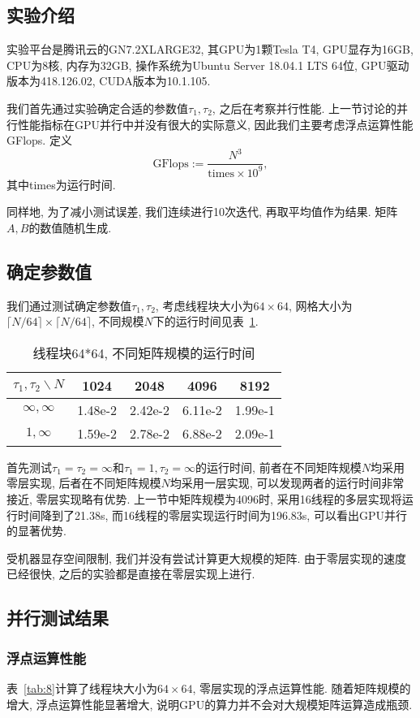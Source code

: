 \documentclass[szjs]{cjcmltx}
\begin{document}
\subsection{实验介绍}
实验平台是腾讯云的GN7.2XLARGE32, 其GPU为1颗Tesla T4, GPU显存为16GB, CPU为8核, 内存为32GB, 操作系统为Ubuntu Server 18.04.1 LTS 64位, GPU驱动版本为418.126.02, CUDA版本为10.1.105.

我们首先通过实验确定合适的参数值$\tau_1,\tau_2$, 之后在考察并行性能. 上一节讨论的并行性能指标在GPU并行中并没有很大的实际意义, 因此我们主要考虑浮点运算性能GFlops. 定义
\[\text{GFlops}:=\dfrac{N^3}{\text{times}\times 10^9},\]
其中times为运行时间.

同样地, 为了减小测试误差, 我们连续进行10次迭代, 再取平均值作为结果. 矩阵$A,B$的数值随机生成.

\subsection{确定参数值}
我们通过测试确定参数值$\tau_1,\tau_2$, 考虑线程块大小为$64\times 64$, 网格大小为$\lceil N/64\rceil\times\lceil N/64\rceil$, 不同规模$N$下的运行时间见表~\ref{tab:7}. 

\begin{table}[htbp]\centering\caption{线程块64*64, 不同矩阵规模的运行时间}\label{tab:7}
\begin{tabular}{|c|c|c|c|c|}\hline
$\tau_1,\tau_2\backslash N$ & 1024 & 2048 & 4096 & 8192\\
\hline
$\infty,\infty$ & 1.48e-2 & 2.42e-2 & 6.11e-2 & 1.99e-1\\
\hline
$1,\infty$ & 1.59e-2 & 2.78e-2 & 6.88e-2 & 2.09e-1\\
\hline
\end{tabular}
\end{table}

首先测试$\tau_1=\tau_2=\infty$和$\tau_1=1,\tau_2=\infty$的运行时间, 前者在不同矩阵规模$N$均采用零层实现, 后者在不同矩阵规模$N$均采用一层实现, 可以发现两者的运行时间非常接近, 零层实现略有优势. 上一节中矩阵规模为4096时, 采用16线程的多层实现将运行时间降到了21.38s, 而16线程的零层实现运行时间为196.83s, 可以看出GPU并行的显著优势.

受机器显存空间限制, 我们并没有尝试计算更大规模的矩阵. 由于零层实现的速度已经很快, 之后的实验都是直接在零层实现上进行.

\subsection{并行测试结果}
\subsubsection{浮点运算性能}
表~\ref{tab:8}计算了线程块大小为$64\times 64$, 零层实现的浮点运算性能. 随着矩阵规模的增大, 浮点运算性能显著增大, 说明GPU的算力并不会对大规模矩阵运算造成瓶颈.
\end{document}
